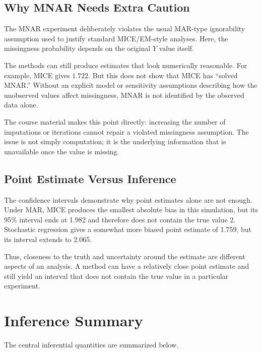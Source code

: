 \documentclass[11pt,a4paper]{article}
\begin{document}
\subsection{Why MNAR Needs Extra Caution}
The MNAR experiment deliberately violates the usual MAR-type ignorability assumption used to justify standard MICE/EM-style analyses. Here, the missingness probability depends on the original $Y$ value itself.

The methods can still produce estimates that look numerically reasonable. For example, MICE gives $1.722$. But this does not show that MICE has ``solved MNAR.'' Without an explicit model or sensitivity assumptions describing how the unobserved values affect missingness, MNAR is not identified by the observed data alone.

The course material makes this point directly: increasing the number of imputations or iterations cannot repair a violated missingness assumption. The issue is not simply computation; it is the underlying information that is unavailable once the value is missing.

\subsection{Point Estimate Versus Inference}
The confidence intervals demonstrate why point estimates alone are not enough. Under MAR, MICE produces the smallest absolute bias in this simulation, but its 95\% interval ends at 1.982 and therefore does not contain the true value 2. Stochastic regression gives a somewhat more biased point estimate of 1.759, but its interval extends to 2.065.

Thus, closeness to the truth and uncertainty around the estimate are different aspects of an analysis. A method can have a relatively close point estimate and still yield an interval that does not contain the true value in a particular experiment.

\section{Inference Summary}
The central inferential quantities are summarized below.
\end{document}
